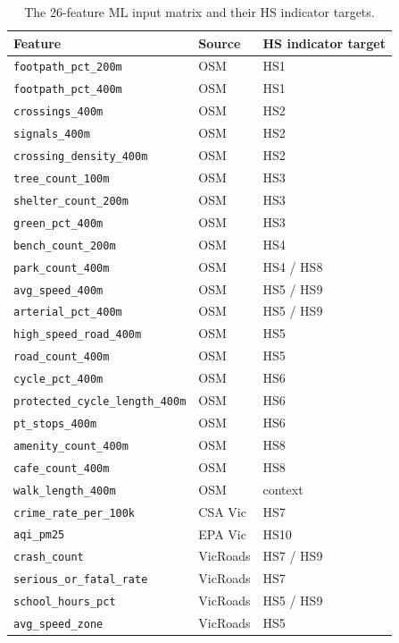 \documentclass[11pt,a4paper,openany]{book}
\begin{document}
\begin{table}[H]
\centering
\caption{The 26-feature ML input matrix and their HS indicator targets.}
\label{tab:eleven:features}
\begin{tabular}{L{5.8cm} C{1.5cm} L{4.5cm}}
\toprule
\textbf{Feature} & \textbf{Source} & \textbf{HS indicator target} \\
\midrule
\texttt{footpath\_pct\_200m}             & OSM & HS1 \\
\texttt{footpath\_pct\_400m}             & OSM & HS1 \\
\texttt{crossings\_400m}                 & OSM & HS2 \\
\texttt{signals\_400m}                   & OSM & HS2 \\
\texttt{crossing\_density\_400m}         & OSM & HS2 \\
\texttt{tree\_count\_100m}               & OSM & HS3 \\
\texttt{shelter\_count\_200m}            & OSM & HS3 \\
\texttt{green\_pct\_400m}                & OSM & HS3 \\
\texttt{bench\_count\_200m}              & OSM & HS4 \\
\texttt{park\_count\_400m}               & OSM & HS4 / HS8 \\
\texttt{avg\_speed\_400m}                & OSM & HS5 / HS9 \\
\texttt{arterial\_pct\_400m}             & OSM & HS5 / HS9 \\
\texttt{high\_speed\_road\_400m}         & OSM & HS5 \\
\texttt{road\_count\_400m}               & OSM & HS5 \\
\texttt{cycle\_pct\_400m}                & OSM & HS6 \\
\texttt{protected\_cycle\_length\_400m}  & OSM & HS6 \\
\texttt{pt\_stops\_400m}                 & OSM & HS6 \\
\texttt{amenity\_count\_400m}            & OSM & HS8 \\
\texttt{cafe\_count\_400m}               & OSM & HS8 \\
\texttt{walk\_length\_400m}              & OSM & context \\
\texttt{crime\_rate\_per\_100k}          & CSA Vic & HS7 \\
\texttt{aqi\_pm25}                       & EPA Vic & HS10 \\
\texttt{crash\_count}                    & VicRoads & HS7 / HS9 \\
\texttt{serious\_or\_fatal\_rate}        & VicRoads & HS7 \\
\texttt{school\_hours\_pct}              & VicRoads & HS5 / HS9 \\
\texttt{avg\_speed\_zone}                & VicRoads & HS5 \\
\bottomrule
\end{tabular}
\end{table}
\end{document}
